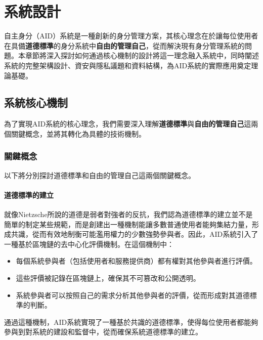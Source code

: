
\chapter{系統設計}
自主身分（AID）系統是一種創新的身分管理方案，其核心理念在於讓每位使用者在具備\textbf{道德標準}的身分系統中\textbf{自由的管理自己}，從而解決現有身分管理系統的問題。本章節將深入探討如何通過核心機制的設計將這一理念融入系統中，同時闡述系統的完整架構設計、資安與隱私議題和資料結構，為AID系統的實際應用奠定理論基礎。
\section{系統核心機制}
為了實現AID系統的核心理念，我們需要深入理解\textbf{道德標準}與\textbf{自由的管理自己}這兩個關鍵概念，並將其轉化為具體的技術機制。
\subsection{關鍵概念}
以下將分別探討道德標準和自由的管理自己這兩個關鍵概念。
\subsubsection{道德標準的建立}
就像Nietzsche所說的道德是弱者對強者的反抗，我們認為道德標準的建立並不是簡單的制定某些規範，而是創建出一種機制能讓多數普通使用者能夠集結力量，形成共識，從而有效地制衡可能濫用權力的少數強勢參與者。因此，AID系統引入了一種基於區塊鏈的去中心化評價機制。在這個機制中：
\begin{itemize}
  \item 每個系統參與者（包括使用者和服務提供商）都有權對其他參與者進行評價。
  \item 這些評價被記錄在區塊鏈上，確保其不可篡改和公開透明。
  \item 系統參與者可以按照自己的需求分析其他參與者的評價，從而形成對其道德標準的判斷。
\end{itemize}
通過這種機制，AID系統實現了一種基於共識的道德標準，使得每位使用者都能夠參與到對系統的建設和監督中，從而確保系統道德標準的建立。\newpage
